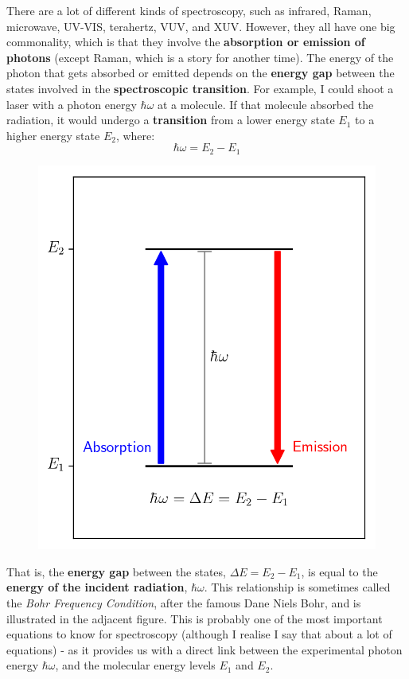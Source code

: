 \documentclass{memoir}[11pt,oneside,a4paper,openany]
\begin{document}
There are a lot of different kinds of spectroscopy, such as infrared, Raman, microwave, UV-VIS, terahertz, VUV, and XUV. However, they all have one big commonality, which is that they involve the \textbf{absorption or emission of photons} (except Raman, which is a story for another time). The energy of the photon that gets absorbed or emitted depends on the \textbf{energy gap} between the states involved in the \textbf{spectroscopic transition}. For example, I could shoot a laser with a photon energy $\hbar\omega$ at a molecule. If that molecule absorbed the radiation, it would undergo a \textbf{transition} from a lower energy state $E_1$ to a higher energy state $E_2$, where:
\begin{equation}
	\hbar\omega = E_2-E_1
\end{equation}
\begin{figure}
\centering
	\includegraphics[width=\linewidth]{energy_gap}
\end{figure}
That is, the \textbf{energy gap} between the states, $\Delta E = E_2 - E_1$, is equal to the \textbf{energy of the incident radiation}, $\hbar\omega$. This relationship is sometimes called the \emph{Bohr Frequency Condition}, after the famous Dane Niels Bohr, and is illustrated in the adjacent figure. This is probably one of the most important equations to know for spectroscopy (although I realise I say that about a lot of equations) - as it provides us with a direct link between the experimental photon energy $\hbar\omega$, and the molecular energy levels $E_1$ and $E_2$. 
\end{document}
